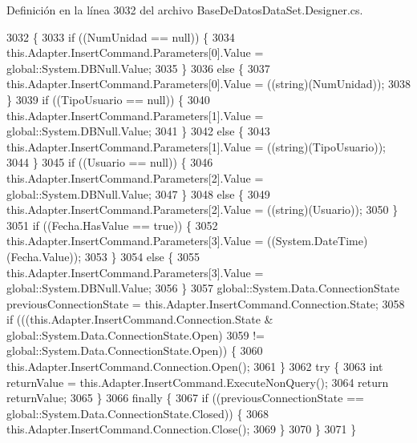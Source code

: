 Definición en la línea 3032 del archivo Base\-De\-Datos\-Data\-Set.\-Designer.\-cs.


\begin{DoxyCode}
3032                                                                                                            
                                       \{
3033             \textcolor{keywordflow}{if} ((NumUnidad == null)) \{
3034                 this.Adapter.InsertCommand.Parameters[0].Value = global::System.DBNull.Value;
3035             \}
3036             \textcolor{keywordflow}{else} \{
3037                 this.Adapter.InsertCommand.Parameters[0].Value = ((string)(NumUnidad));
3038             \}
3039             \textcolor{keywordflow}{if} ((TipoUsuario == null)) \{
3040                 this.Adapter.InsertCommand.Parameters[1].Value = global::System.DBNull.Value;
3041             \}
3042             \textcolor{keywordflow}{else} \{
3043                 this.Adapter.InsertCommand.Parameters[1].Value = ((string)(TipoUsuario));
3044             \}
3045             \textcolor{keywordflow}{if} ((Usuario == null)) \{
3046                 this.Adapter.InsertCommand.Parameters[2].Value = global::System.DBNull.Value;
3047             \}
3048             \textcolor{keywordflow}{else} \{
3049                 this.Adapter.InsertCommand.Parameters[2].Value = ((string)(Usuario));
3050             \}
3051             \textcolor{keywordflow}{if} ((Fecha.HasValue == \textcolor{keyword}{true})) \{
3052                 this.Adapter.InsertCommand.Parameters[3].Value = ((System.DateTime)(Fecha.Value));
3053             \}
3054             \textcolor{keywordflow}{else} \{
3055                 this.Adapter.InsertCommand.Parameters[3].Value = global::System.DBNull.Value;
3056             \}
3057             global::System.Data.ConnectionState previousConnectionState = 
      this.Adapter.InsertCommand.Connection.State;
3058             \textcolor{keywordflow}{if} (((this.Adapter.InsertCommand.Connection.State & global::System.Data.ConnectionState.Open) 
3059                         != global::System.Data.ConnectionState.Open)) \{
3060                 this.Adapter.InsertCommand.Connection.Open();
3061             \}
3062             \textcolor{keywordflow}{try} \{
3063                 \textcolor{keywordtype}{int} returnValue = this.Adapter.InsertCommand.ExecuteNonQuery();
3064                 \textcolor{keywordflow}{return} returnValue;
3065             \}
3066             \textcolor{keywordflow}{finally} \{
3067                 \textcolor{keywordflow}{if} ((previousConnectionState == global::System.Data.ConnectionState.Closed)) \{
3068                     this.Adapter.InsertCommand.Connection.Close();
3069                 \}
3070             \}
3071         \}
\end{DoxyCode}
